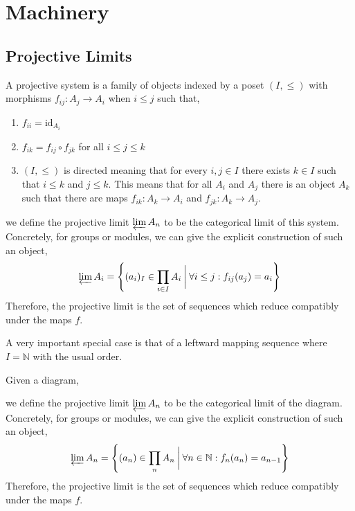 \documentclass{article}
\newcommand{\N}{\mathbb{N}}
\newcommand{\id}{\mathrm{id}}
\theoremstyle{definition}
\newenvironment{definition}[1][Definition:]{\begin{trivlist}
\item[\hskip \labelsep {\bfseries #1}]}{\end{trivlist}}
\begin{document}
\section{Machinery}

\subsection{Projective Limits}

\begin{definition}
A projective system is a family of objects indexed by a poset $(I, \le)$ with morphisms $f_{ij} : A_j \to A_i$ when $i \le j$ such that,
\begin{enumerate}
\item $f_{ii} = \id_{A_i}$
\item $f_{ik} = f_{ij} \circ f_{jk}$ for all $i \le j \le k$
\item $(I, \le)$ is directed meaning that for every $i, j \in I$ there exists $k \in I$ such that $i \le k$ and $j \le k$. This means that for all $A_i$ and $A_j$ there is an object $A_k$ such that there are maps $f_{ik} : A_k \to A_i$ and $f_{jk} : A_k \to A_j$.
\end{enumerate}
we define the projective limit $\varprojlim A_n$ to be the categorical limit of this system. Concretely, for groups or modules, we can give the explicit construction of such an object,
\[ \varprojlim A_i = \left\{ (a_i)_{I} \in \prod_{i \in I} A_i \: \bigg| \: \forall i \le j : f_{ij}(a_j) = a_{i}  \right\} \]
Therefore, the projective limit is the set of sequences which reduce compatibly under the maps $f$.  
\end{definition}

\noindent
A very important special case is that of a leftward mapping sequence where $I = \N$ with the usual order. 

\begin{definition}
Given a diagram,
\begin{center}
\end{center}
we define the projective limit $\varprojlim A_n$ to be the categorical limit of the diagram. Concretely, for groups or modules, we can give the explicit construction of such an object,
\[ \varprojlim A_n = \left\{ (a_n) \in \prod_n A_n \: \bigg| \: \forall n \in \N : f_n(a_n) = a_{n-1}  \right\} \]
Therefore, the projective limit is the set of sequences which reduce compatibly under the maps $f$.  
\end{definition}
\end{document}
